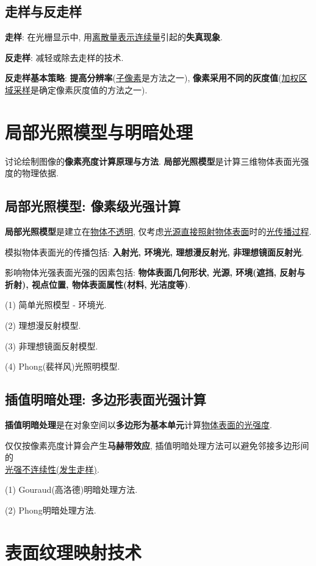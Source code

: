 \documentclass[12pt, a4paper, oneside]{ctexart}
\def\ul{\underline}         %
\def\bf{\textbf}            %
\begin{document}
\subsection{走样与反走样}

\bf{走样}: 在光栅显示中, 用\ul{离散量表示连续量}引起的\bf{失真现象}.

\bf{反走样}: 减轻或除去走样的技术.

\bf{反走样基本策略}: \bf{提高分辨率}(\ul{子像素}是方法之一), \bf{像素采用不同的灰度值}(\ul{加权区域采样}是确定像素灰度值的方法之一).

\section{局部光照模型与明暗处理}

讨论绘制图像的\bf{像素亮度计算原理与方法}. \bf{局部光照模型}是计算三维物体表面光强度的物理依据.

\subsection{局部光照模型: 像素级光强计算}

\bf{局部光照模型}是建立在\ul{物体不透明}, 仅考虑\ul{光源直接照射物体表面}时的\ul{光传播过程}.

模拟物体表面光的传播包括: \bf{入射光, 环境光, 理想漫反射光, 非理想镜面反射光}.

影响物体光强表面光强的因素包括: \bf{物体表面几何形状, 光源, 环境(遮挡, 反射与折射), 视点位置, 物体表面属性(材料, 光洁度等)}.

(1) 简单光照模型 - 环境光.

(2) 理想漫反射模型.

(3) 非理想镜面反射模型.

(4) Phong(裴祥风)光照明模型.

\subsection{插值明暗处理: 多边形表面光强计算}

\bf{插值明暗处理}是在对象空间以\bf{多边形为基本单元}计算\ul{物体表面的光强度}.

仅仅按像素亮度计算会产生\bf{马赫带效应}, 插值明暗处理方法可以避免邻接多边形间的\\\ul{光强不连续性(发生走样)}.

(1) Gouraud(高洛德)明暗处理方法.

(2) Phong明暗处理方法.

\section{表面纹理映射技术}
\end{document}
